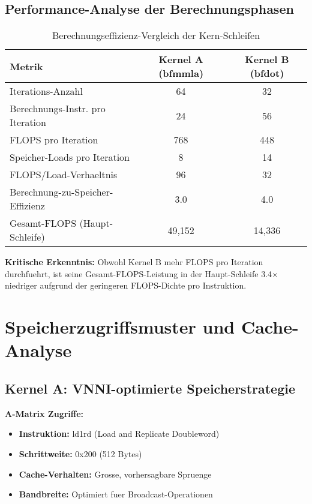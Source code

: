 \documentclass[11pt,a4paper]{article}
\begin{document}
\subsection{Performance-Analyse der Berechnungsphasen}

\begin{table}[H]
\centering
\caption{Berechnungseffizienz-Vergleich der Kern-Schleifen}
\begin{tabular}{lcc}
\toprule
\textbf{Metrik} & \textbf{Kernel A (bfmmla)} & \textbf{Kernel B (bfdot)} \\
\midrule
Iterations-Anzahl & 64 & 32 \\
Berechnungs-Instr. pro Iteration & 24 & 56 \\
FLOPS pro Iteration & 768 & 448 \\
Speicher-Loads pro Iteration & 8 & 14 \\
FLOPS/Load-Verhaeltnis & 96 & 32 \\
Berechnung-zu-Speicher-Effizienz & 3.0 & 4.0 \\
Gesamt-FLOPS (Haupt-Schleife) & 49,152 & 14,336 \\
\bottomrule
\end{tabular}
\end{table}

\textbf{Kritische Erkenntnis:} Obwohl Kernel B mehr FLOPS pro Iteration durchfuehrt, ist seine Gesamt-FLOPS-Leistung in der Haupt-Schleife 3.4$\times$ niedriger aufgrund der geringeren FLOPS-Dichte pro Instruktion.

\section{Speicherzugriffsmuster und Cache-Analyse}

\subsection{Kernel A: VNNI-optimierte Speicherstrategie}

\textbf{A-Matrix Zugriffe:}
\begin{itemize}
\item \textbf{Instruktion:} ld1rd (Load and Replicate Doubleword)
\item \textbf{Schrittweite:} 0x200 (512 Bytes)
\item \textbf{Cache-Verhalten:} Grosse, vorhersagbare Spruenge
\item \textbf{Bandbreite:} Optimiert fuer Broadcast-Operationen
\end{itemize}
\end{document}
